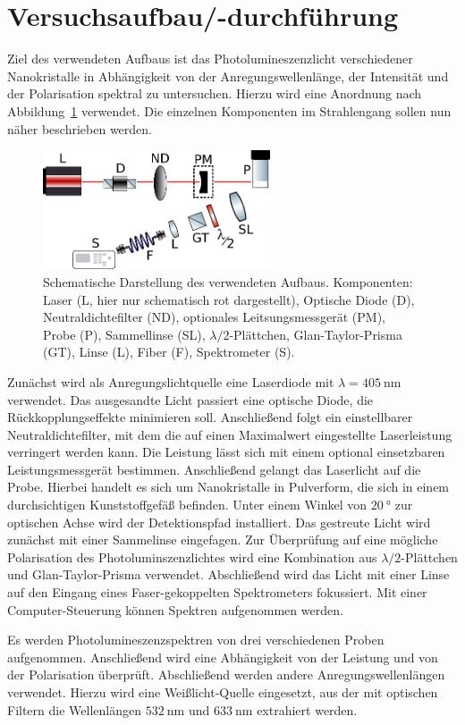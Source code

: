 \section{Versuchsaufbau/-durchführung}
Ziel des verwendeten Aufbaus ist das Photolumineszenzlicht verschiedener Nanokristalle in Abhängigkeit
von der Anregungswellenlänge, der Intensität und der Polarisation spektral zu untersuchen.
Hierzu wird eine Anordnung nach Abbildung~\ref{fig: aufbau} verwendet. Die einzelnen Komponenten
im Strahlengang sollen nun näher beschrieben werden.

\begin{figure}
  \centering
  \includegraphics[width = 0.6\textwidth]{pics/setup.pdf}
  \caption{Schematische Darstellung des verwendeten Aufbaus. Komponenten: Laser (L, hier nur schematisch rot dargestellt), Optische Diode (D), Neutraldichtefilter (ND),
  optionales Leitsungsmessgerät (PM), Probe (P), Sammellinse (SL), $\lambda / 2$-Plättchen, Glan-Taylor-Prisma (GT), Linse (L), Fiber (F), Spektrometer (S).}
  \label{fig: aufbau}
\end{figure}

Zunächst wird als Anregungslichtquelle eine Laserdiode mit $\lambda = \SI{405}{\nano\meter}$ verwendet.
Das ausgesandte Licht passiert eine optische Diode, die Rückkopplungseffekte minimieren soll.
Anschließend folgt ein einstellbarer Neutraldichtefilter, mit dem die auf einen Maximalwert eingestellte Laserleistung
verringert werden kann. Die Leistung lässt sich mit einem optional einsetzbaren Leistungsmessgerät bestimmen.
Anschließend gelangt das Laserlicht auf die Probe. Hierbei handelt es sich um Nanokristalle in Pulverform, die sich in
einem durchsichtigen Kunststoffgefäß befinden. Unter einem Winkel von $\SI{20}{\degree}$ zur optischen Achse wird der
Detektionspfad installiert. Das gestreute Licht wird zunächst mit einer Sammelinse eingefagen. Zur Überprüfung auf eine
mögliche Polarisation des Photoluminszenzlichtes wird eine Kombination aus $\lambda / 2$-Plättchen und
Glan-Taylor-Prisma verwendet.
Abschließend wird das Licht mit einer Linse auf den Eingang eines Faser-gekoppelten
Spektrometers fokussiert. Mit einer Computer-Steuerung können Spektren aufgenommen werden.

Es werden Photolumineszenzspektren von drei verschiedenen Proben aufgenommen. Anschließend wird eine Abhängigkeit von der
Leistung und von der Polarisation überprüft. Abschließend werden andere Anregungswellenlängen verwendet. Hierzu wird
eine Weißlicht-Quelle eingesetzt, aus der mit optischen Filtern die Wellenlängen
$\SI{532}{\nano\meter}$ und $\SI{633}{\nano\meter}$ extrahiert werden.
